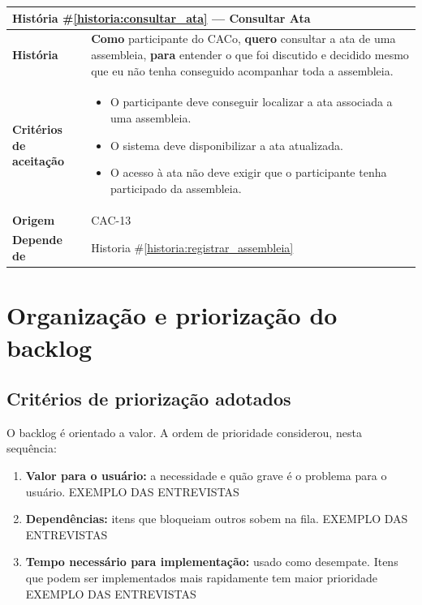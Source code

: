 \documentclass[12pt,a4paper]{article}
\newcounter{historia}
\begin{document}
\label{historia:consultar_ata}
\begin{table}[H]
    \centering
    \begin{tabular}{|m{4.5cm} | m{11cm}|}
    \hline
    
    \multicolumn{2}{|l|}{\textbf{História \#\ref{historia:consultar_ata} --- Consultar Ata}} \\
    
    \hline  \textbf{História} &
    \textbf{Como} participante do CACo, \newline
    \textbf{quero} consultar a ata de uma assembleia, \newline  
    \textbf{para} entender o que foi discutido e decidido mesmo que eu não tenha conseguido acompanhar toda a assembleia.\\
    
    \textbf{Critérios de aceitação} &
    \begin{itemize}
        \item{O participante deve conseguir localizar a ata associada a uma assembleia.}
        \item{O sistema deve disponibilizar a ata atualizada.}
        \item{O acesso à ata não deve exigir que o participante tenha participado da assembleia.}
    \end{itemize}\\
    
    \textbf{Origem} &
    CAC-13\\
    
    \textbf{Depende de} &
    Historia \#\ref{historia:registrar_assembleia} \\
    
    \hline
    \end{tabular}
\end{table}
\section{Organiza\c{c}\~ao e prioriza\c{c}\~ao do backlog}

\subsection{Crit\'erios de prioriza\c{c}\~ao adotados}

O backlog \'e orientado a valor. A ordem de prioridade considerou, nesta sequ\^encia:

\begin{enumerate}
  \item \textbf{Valor para o usu\'ario:} a necessidade e qu\~ao grave
  \'e o problema para o usu\'ario. EXEMPLO DAS ENTREVISTAS
  \item \textbf{Depend\^encias:} itens que bloqueiam outros sobem na fila. EXEMPLO DAS ENTREVISTAS
  \item \textbf{Tempo necessário para implementação:} usado como desempate. Itens que podem ser implementados mais rapidamente tem maior prioridade EXEMPLO DAS ENTREVISTAS
\end{enumerate}
\end{document}
